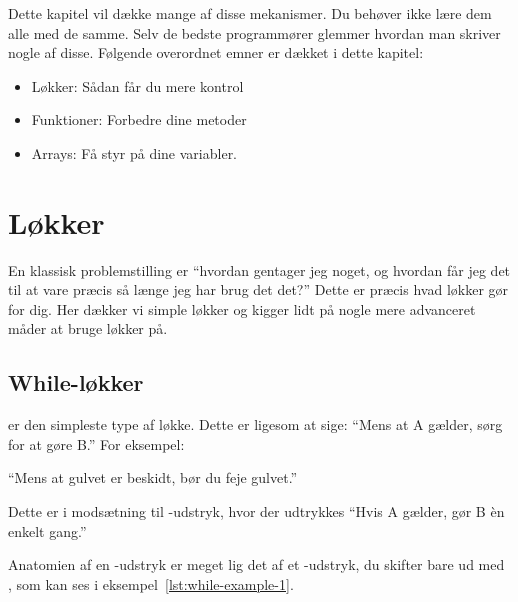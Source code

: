 
    Dette kapitel vil dække mange af disse mekanismer. Du behøver ikke
    lære dem alle med de samme. Selv de bedste programmører glemmer
    hvordan man skriver nogle af disse. Følgende overordnet emner er
    dækket i dette kapitel:

	\begin{itemize} %
		\item Løkker: Sådan får du mere kontrol
		\item Funktioner: Forbedre dine metoder
		\item Arrays: Få styr på dine variabler.
	\end{itemize}

\section{Løkker}

    En klassisk problemstilling er ``hvordan gentager jeg noget, og
    hvordan får jeg det til at vare præcis så længe jeg har brug det
    det?'' Dette er præcis hvad løkker gør for dig. Her dækker vi
    simple løkker og kigger lidt på nogle mere advanceret måder at
    bruge løkker på.

	\subsection{While-løkker}

         er den simpleste type af løkke. Dette er ligesom at
		sige: ``Mens at A gælder, sørg for at gøre B.'' For eksempel:

		``Mens at gulvet er beskidt, bør du feje gulvet.''

		Dette er i modsætning til -udstryk, hvor der udtrykkes
		``Hvis A gælder, gør B èn enkelt gang.''



		Anatomien af en -udstryk er meget lig det af et
		-udstryk, du skifter bare  ud med
		, som kan ses i eksempel~\ref{lst:while-example-1}.

